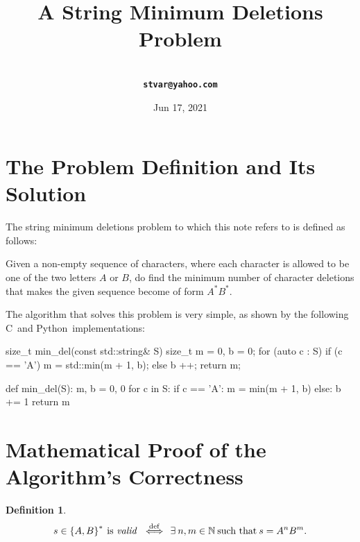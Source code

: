 \documentclass[a4paper,9pt,leqno]{article}
\title{A String Minimum Deletions Problem}
\author{\larger\vargyas\medskip\\ \tt\textbf{stvar@yahoo.com}}
\date{Jun 17, 2021}
\renewcommand{\=}{\protect\nobreakdash-\hspace{0pt}}
\renewcommand{\~}{\protect\nobreakdash--\hspace{0pt}}
\newcommand{\plusplus}{\textbf{\raisebox{1pt}{++}}}
\newcommand{\cplusplus}{C\plusplus}
\newcommand{\python}{Python}
\theoremstyle{plain}
\theoremstyle{definition}
\newtheorem{definition}[fact]{Definition}
\theoremstyle{remark}
\newcommand{\iffl}{\:\:\Longleftrightarrow\:\:}
\newcommand{\by}[1]{{#1}}
\newcommand{\bydef}{\by{def}}
\newcommand{\symby}[2]{\stackrel{#1}{{#2}}}
\newcommand{\symbyrm}[2]{\symby{{\rm\scriptstyle{#1}}}{#2}}
\newcommand{\iffby}[1]{\symbyrm{#1}{\iffl}}
\newcommand{\iffbydef}{\iffby{\bydef}}
\newcommand{\txt}[1]{\:\text{#1}\:}
\newcommand{\ms}{\:}
\newcommand{\lc}{\left\{}
\newcommand{\rc}{\right\}}
\newcommand\Nat{\mathbb{N}}
\newcommand\Nat*{\mathbb{N}^*}
\begin{document}
\maketitle
\tableofcontents

\section{The Problem Definition and Its Solution}

The string minimum deletions problem to which this note refers
to is defined as follows:

\begin{quoting}
Given a non-empty sequence of characters, where each character
is allowed to be one of the two letters $A$ or $B$, do find the
minimum number of character deletions that makes the given
sequence become of form $A^\ast\! B^\ast$.
\end{quoting}

The algorithm that solves this problem is very simple, as shown
by the following \cplusplus\ and \python\ implementations:

\medskip

\begin{cpplisting}
size_t min_del(const std::string& S)
{
    size_t m = 0, b = 0;
    for (auto c : S) {
        if (c == 'A')
            m = std::min(m + 1, b);
        else
            b ++;
    }
    return m;
}
\end{cpplisting}

\begin{pylisting}
def min_del(S):
    m, b = 0, 0
    for c in S:
        if c == 'A':
            m = min(m + 1, b)
        else:
            b += 1
    return m
\end{pylisting}

\break

\section{Mathematical Proof of the Algorithm's Correctness}

\begin{definition}
\begin{equation}
s\in\lc A, B\rc^\ast \txt{is {\it valid}} \iffbydef
\exists\ms n, m\in\Nat \txt{such that} s = A^n B^m. \label{defvalid}
\end{equation}
\end{definition}
\end{document}
